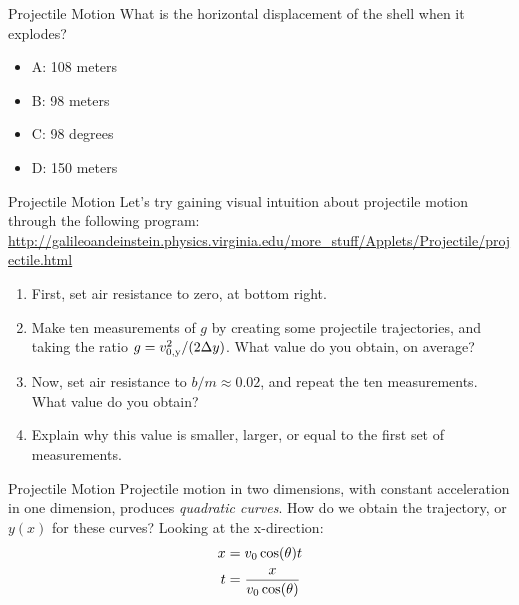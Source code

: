 \documentclass{beamer}
\begin{document}
\begin{frame}{Projectile Motion}
What is the horizontal displacement of the shell when it explodes?
\begin{itemize}
\item A: 108 meters
\item B: 98 meters
\item C: 98 degrees
\item D: 150 meters
\end{itemize}
\end{frame}

\begin{frame}{Projectile Motion}
\small
Let's try gaining visual intuition about projectile motion through the following program: \\
\vspace{0.25cm}
\url{http://galileoandeinstein.physics.virginia.edu/more_stuff/Applets/Projectile/projectile.html}\\
\begin{enumerate}
\item First, set air resistance to zero, at bottom right.
\item Make ten measurements of $g$ by creating some projectile trajectories, and taking the ratio $g = v_{\rm 0,y}^2/(2\Delta y)$.  What value do you obtain, on average?
\item Now, set air resistance to $b/m \approx 0.02$, and repeat the ten measurements.  What value do you obtain?
\item Explain why this value is smaller, larger, or equal to the first set of measurements.
\end{enumerate}
\end{frame}

\begin{frame}{Projectile Motion}
Projectile motion in two dimensions, with constant acceleration in one dimension, produces \textit{quadratic curves}.  How do we obtain the \alert{trajectory}, or $y(x)$ for these curves?  Looking at the x-direction:\\
\begin{align}
x &= v_{\rm 0}\cos(\theta) t \\
t &= \frac{x}{v_{\rm 0} \cos(\theta)} \label{eq:subst}
\end{align}
\end{frame}
\end{document}
